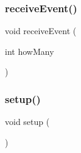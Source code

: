 \subsubsection{\texorpdfstring{receive\+Event()}{receiveEvent()}}
{\footnotesize\ttfamily void receive\+Event (\begin{DoxyParamCaption}\item[{int}]{how\+Many }\end{DoxyParamCaption})}

\mbox{\label{slave__receiver_8ino_a4fc01d736fe50cf5b977f755b675f11d}} 
\subsubsection{\texorpdfstring{setup()}{setup()}}
{\footnotesize\ttfamily void setup (\begin{DoxyParamCaption}{ }\end{DoxyParamCaption})}

